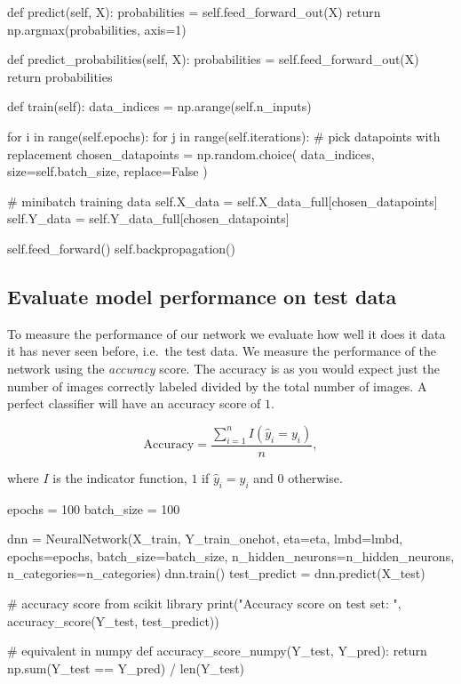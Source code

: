 \documentclass[%
oneside,                 %
final,                   %
10pt]{article}
\begin{document}
    def predict(self, X):
        probabilities = self.feed_forward_out(X)
        return np.argmax(probabilities, axis=1)

    def predict_probabilities(self, X):
        probabilities = self.feed_forward_out(X)
        return probabilities

    def train(self):
        data_indices = np.arange(self.n_inputs)

        for i in range(self.epochs):
            for j in range(self.iterations):
                # pick datapoints with replacement
                chosen_datapoints = np.random.choice(
                    data_indices, size=self.batch_size, replace=False
                )

                # minibatch training data
                self.X_data = self.X_data_full[chosen_datapoints]
                self.Y_data = self.Y_data_full[chosen_datapoints]

                self.feed_forward()
                self.backpropagation()
\epycod

\subsection{Evaluate model performance on test data}

To measure the performance of our network we evaluate how well it does it data it has never seen before, i.e.~the test data.  
We measure the performance of the network using the \emph{accuracy} score.  
The accuracy is as you would expect just the number of images correctly labeled divided by the total number of images. A perfect classifier will have an accuracy score of $1$.  

$$ \text{Accuracy} = \frac{\sum_{i=1}^n I(\hat{y}_i = y_i)}{n} ,$$  

where $I$ is the indicator function, $1$ if $\hat{y}_i = y_i$ and $0$ otherwise.


\bpycod
epochs = 100
batch_size = 100

dnn = NeuralNetwork(X_train, Y_train_onehot, eta=eta, lmbd=lmbd, epochs=epochs, batch_size=batch_size,
                    n_hidden_neurons=n_hidden_neurons, n_categories=n_categories)
dnn.train()
test_predict = dnn.predict(X_test)

# accuracy score from scikit library
print("Accuracy score on test set: ", accuracy_score(Y_test, test_predict))

# equivalent in numpy
def accuracy_score_numpy(Y_test, Y_pred):
    return np.sum(Y_test == Y_pred) / len(Y_test)
\end{document}
